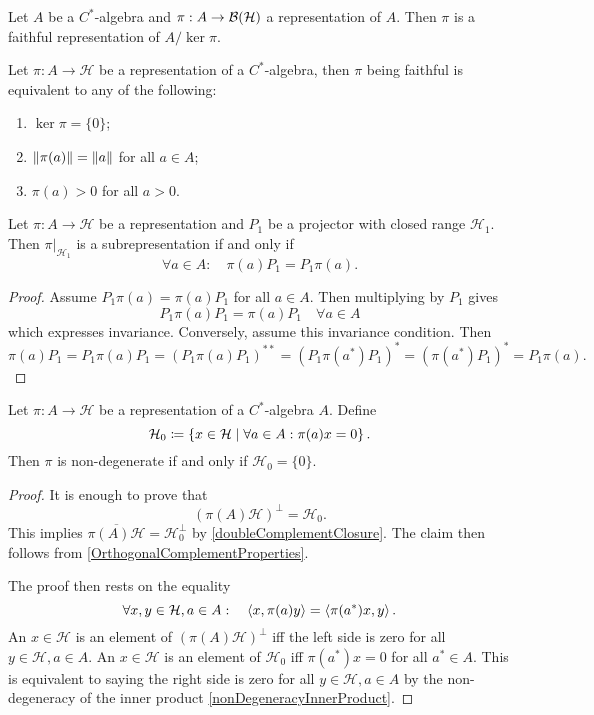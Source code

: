 \begin{lemma}
Let $A$ be a $C^*$-algebra and $\pi: A \to \operatorname{\mathcal{B}}(\mathcal{H})$ a representation of $A$. Then $\pi$ is a faithful representation of $A/\ker\pi$.
\end{lemma}

\begin{proposition}
Let $\pi:A\to\mathcal{H}$ be a representation of a $C^*$-algebra, then $\pi$ being faithful is equivalent to any of the following:
\begin{enumerate}
\item $\ker \pi = \{0\}$;
\item $\lVert\pi(a)\rVert = \lVert a\rVert$ for all $a\in A$;
\item $\pi(a) > 0$ for all $a>0$.
\end{enumerate}
\end{proposition}

\begin{lemma}
Let $\pi: A\to\mathcal{H}$ be a representation and $P_1$ be a projector with closed range $\mathcal{H}_1$. Then $\pi|_{\mathcal{H}_1}$ is a subrepresentation \textup{if and only if}
\[ \forall a\in A: \quad \pi(a)P_1 = P_1\pi(a).  \]
\end{lemma}
\begin{proof}
Assume $P_1\pi(a) = \pi(a)P_1$ for all $a\in A$. Then multiplying by $P_1$ gives
\[ P_1\pi(a)P_1 = \pi(a)P_1 \quad \forall a\in A \]
which expresses invariance. Conversely, assume this invariance condition. Then
\[ \pi(a)P_1 = P_1\pi(a)P_1 = (P_1\pi(a)P_1)^{**} = (P_1\pi(a^*)P_1)^{*} = (\pi(a^*)P_1)^* = P_1\pi(a). \]
\end{proof}

\begin{lemma} \label{nonDegeneracyAlgebraRepresentation}
Let $\pi:A\to \mathcal{H}$ be a representation of a $C^*$-algebra $A$. Define
\[ \mathcal{H}_0 \coloneqq \left\{ x\in\mathcal{H} \;\middle|\; \forall a\in A: \pi(a)x = 0 \right\}. \]
Then $\pi$ is non-degenerate \textup{if and only if} $\mathcal{H}_0 = \{0\}$.
\end{lemma}
\begin{proof}
It is enough to prove that
\[ (\pi(A)\mathcal{H})^\perp = \mathcal{H}_0. \]
This implies $\overline{\pi(A)\mathcal{H}} = \mathcal{H}_0^\perp$ by \ref{doubleComplementClosure}. The claim then follows from \ref{OrthogonalComplementProperties}.

The proof then rests on the equality
\[ \forall x,y\in \mathcal{H}, a\in A: \quad \left\langle x,\pi(a)y \right\rangle = \left\langle \pi(a^*)x,y \right\rangle. \]
An $x\in\mathcal{H}$ is an element of $(\pi(A)\mathcal{H})^\perp$ iff the left side is zero for all $y\in\mathcal{H},a\in A$. An $x\in\mathcal{H}$ is an element of $\mathcal{H}_0$ iff $\pi(a^*)x = 0$ for all $a^*\in A$. This is equivalent to saying the right side is zero for all $y\in\mathcal{H},a\in A$ by the non-degeneracy of the inner product \ref{nonDegeneracyInnerProduct}.
\end{proof}

